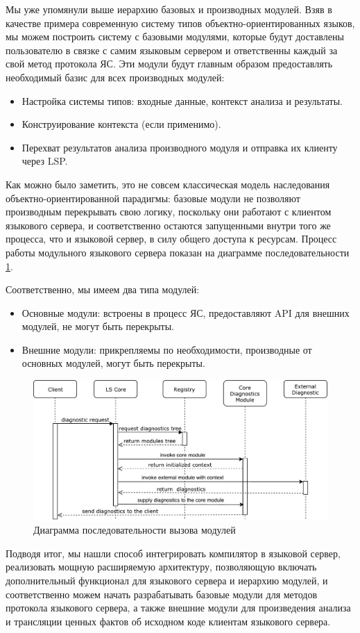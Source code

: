 Мы уже упомянули выше иерархию базовых и производных модулей. Взяв в качестве примера современную систему типов объектно-ориентированных языков, мы можем построить систему с базовыми модулями, которые будут доставлены пользователю в связке с самим языковым сервером и ответственны каждый за свой метод протокола ЯС. Эти модули будут главным образом предоставлять необходимый базис для всех производных модулей:
\begin{itemize}
    \item Настройка системы типов: входные данные, контекст анализа и результаты.
    \item Конструирование контекста (если применимо).
    \item Перехват результатов анализа производного модуля и отправка их клиенту через LSP.
\end{itemize}

Как можно было заметить, это не совсем классическая модель наследования объектно-ориентированной парадигмы: базовые модули не позволяют производным перекрывать свою логику, поскольку они работают с клиентом языкового сервера, и соответственно остаются запущенными внутри того же процесса, что и языковой сервер, в силу общего доступа к ресурсам. Процесс работы модульного языкового сервера показан на диаграмме последовательности \ref{fig:met:modules_sd}.

Соответственно, мы имеем два типа модулей:
\begin{itemize}
    \item Основные модули: встроены в процесс ЯС, предоставляют API для внешних модулей, не могут быть перекрыты.
    \item Внешние модули: прикрепляемы по необходимости, производные от основных модулей, могут быть перекрыты.
\end{itemize}

\begin{figure}[H]
    \centering
    \includegraphics[width=1.0\textwidth]{figs/modules_sd.pdf}
    \caption{Диаграмма последовательности вызова модулей}
    \label{fig:met:modules_sd}
\end{figure}

Подводя итог, мы нашли способ интегрировать компилятор в языковой сервер, реализовать мощную расширяемую архитектуру, позволяющую включать дополнительный функционал для языкового сервера и иерархию модулей, и соответственно можем начать разрабатывать базовые модули для методов протокола языкового сервера, а также внешние модули для произведения анализа и трансляции ценных фактов об исходном коде клиентам языкового сервера.